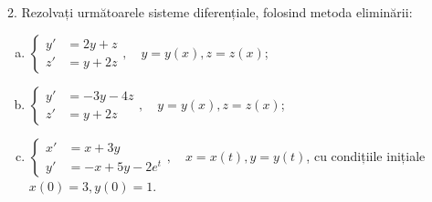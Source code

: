 \vspace{1cm}

2. Rezolvați următoarele sisteme diferențiale, folosind metoda eliminării:
\begin{enumerate}[(a)]
  \item $ \begin{cases}
      y' &= 2y + z \\
      z' &= y + 2z
    \end{cases}, \quad y = y(x), z = z(x)
    $;
  \item $ \begin{cases}
      y' &= -3y - 4z \\
      z' &= y + 2z
    \end{cases}, \quad y = y(x), z = z(x)
    $;
  \item $ \begin{cases}
      x' &= x + 3y \\
      y' &= -x + 5y - 2e^t
    \end{cases}, \quad x = x(t), y = y(t) $,
    cu condițiile inițiale $ x(0) = 3, y(0) = 1 $.
\end{enumerate}


